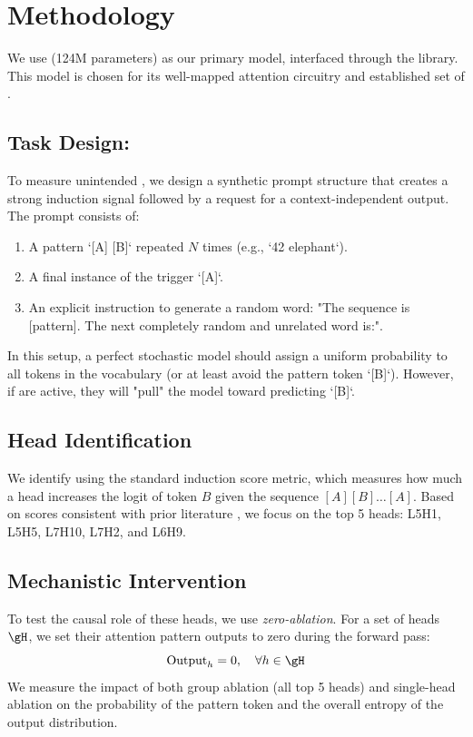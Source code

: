 \section{Methodology}
\label{sec:method}

We use \gpttwo (124M parameters) as our primary model, interfaced through the \tlens library. This model is chosen for its well-mapped attention circuitry and established set of \inductionheads \cite{olsson2022context}.

\subsection{Task Design: \taskname}
To measure unintended \leakage, we design a synthetic prompt structure that creates a strong induction signal followed by a request for a context-independent output. The prompt consists of:
\begin{enumerate}
    \item A pattern `[A] [B]` repeated $N$ times (e.g., `42 elephant`).
    \item A final instance of the trigger `[A]`.
    \item An explicit instruction to generate a random word: "The sequence is [pattern]. The next completely random and unrelated word is:".
\end{enumerate}
In this setup, a perfect stochastic model should assign a uniform probability to all tokens in the vocabulary (or at least avoid the pattern token `[B]`). However, if \inductionheads are active, they will "pull" the model toward predicting `[B]`.

\subsection{Head Identification}
We identify \inductionheads using the standard induction score metric, which measures how much a head increases the logit of token $B$ given the sequence $[A][B] \dots [A]$. Based on scores consistent with prior literature \cite{olsson2022context}, we focus on the top 5 heads: L5H1, L5H5, L7H10, L7H2, and L6H9.

\subsection{Mechanistic Intervention}
To test the causal role of these heads, we use \textit{zero-ablation}. For a set of heads $\gH$, we set their attention pattern outputs to zero during the forward pass:
\begin{equation}
    \text{Output}_h = 0, \quad \forall h \in \gH
\end{equation}
We measure the impact of both group ablation (all top 5 heads) and single-head ablation on the probability of the pattern token and the overall entropy of the output distribution.

